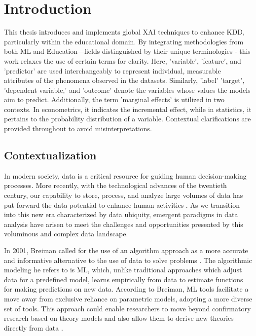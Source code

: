 \chapter{Introduction}
\label{contextualizacao}
This thesis introduces and implements global \gls{XAI} techniques to enhance \gls{KDD}, particularly within the educational domain. By integrating methodologies from both \gls{ML} and Education—fields distinguished by their unique terminologies - this work relaxes the use of certain terms for clarity. Here, 'variable', 'feature', and 'predictor' are used interchangeably to represent individual, measurable attributes of the phenomena observed in the datasets. Similarly, 'label' 'target', 'dependent variable,' and 'outcome' denote the variables whose values the models aim to predict. Additionally, the term 'marginal effects' is utilized in two contexts. In econometrics, it indicates the incremental effect, while in statistics, it pertains to the probability distribution of a variable. Contextual clarifications are provided throughout to avoid misinterpretations.

\section{Contextualization}

In modern society, data is a critical resource for guiding human decision-making processes. More recently, with the technological advances of the twentieth century, our capability to store, process, and analyze large volumes of data has put forward the data potential to enhance human activities \cite{Provost2013DataMaking}. As we transition into this new era characterized by data ubiquity, emergent paradigms in data analysis have arisen to meet the challenges and opportunities presented by this voluminous and complex data landscape. 

In 2001, Breiman called for the use of an algorithm approach as a more accurate and informative alternative to the use of data to solve problems \cite{Breiman2001StatisticalAuthor}. The algorithmic modeling he refers to is \gls{ML}, which, unlike traditional approaches which adjust data for a predefined model, learns empirically from data to estimate functions for making predictions on new data. According to Breiman, \gls{ML} tools facilitate a move away from exclusive reliance on parametric models, adopting a more diverse set of tools. This approach could enable researchers to move beyond confirmatory research based on theory models and also allow them to derive new theories directly from data \cite{Molina2019AnnualSociology}.

